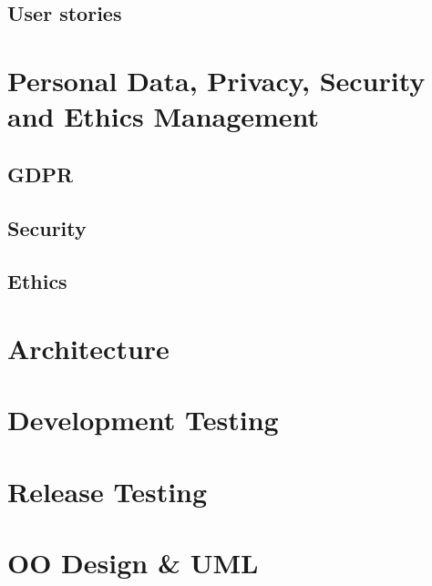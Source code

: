 \documentclass[10pt]{article}
\begin{document}
\subsection{User stories}


\section{Personal Data, Privacy, Security and Ethics Management}
\subsection{GDPR}
\subsection{Security}
\subsection{Ethics}


\section{Architecture}


\section{Development Testing}


\section{Release Testing}


\section{OO Design \& UML}
\end{document}
